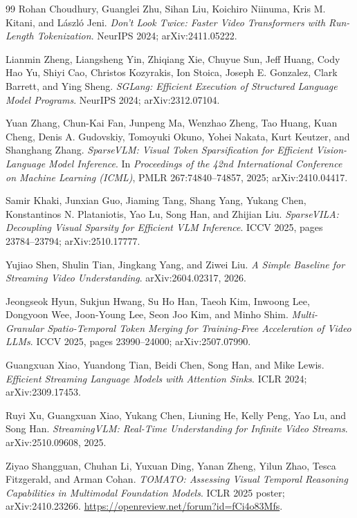\begin{thebibliography}{99}
Rohan Choudhury, Guanglei Zhu, Sihan Liu, Koichiro Niinuma, Kris M. Kitani,
and L\'aszl\'o Jeni.
\emph{Don't Look Twice: Faster Video Transformers with Run-Length
Tokenization}. NeurIPS 2024; arXiv:2411.05222.

Lianmin Zheng, Liangsheng Yin, Zhiqiang Xie, Chuyue Sun, Jeff Huang, Cody Hao
Yu, Shiyi Cao, Christos Kozyrakis, Ion Stoica, Joseph E. Gonzalez, Clark
Barrett, and Ying Sheng.
\emph{SGLang: Efficient Execution of Structured Language Model Programs}.
NeurIPS 2024; arXiv:2312.07104.

Yuan Zhang, Chun-Kai Fan, Junpeng Ma, Wenzhao Zheng, Tao Huang, Kuan Cheng,
Denis A. Gudovskiy, Tomoyuki Okuno, Yohei Nakata, Kurt Keutzer, and Shanghang
Zhang.
\emph{SparseVLM: Visual Token Sparsification for Efficient Vision-Language
Model Inference}. In \emph{Proceedings of the 42nd International Conference
on Machine Learning (ICML)}, PMLR 267:74840--74857, 2025;
arXiv:2410.04417.

Samir Khaki, Junxian Guo, Jiaming Tang, Shang Yang, Yukang Chen, Konstantinos
N. Plataniotis, Yao Lu, Song Han, and Zhijian Liu.
\emph{SparseVILA: Decoupling Visual Sparsity for Efficient VLM Inference}.
ICCV 2025, pages 23784--23794; arXiv:2510.17777.

Yujiao Shen, Shulin Tian, Jingkang Yang, and Ziwei Liu.
\emph{A Simple Baseline for Streaming Video Understanding}. arXiv:2604.02317,
2026.

Jeongseok Hyun, Sukjun Hwang, Su Ho Han, Taeoh Kim, Inwoong Lee, Dongyoon Wee,
Joon-Young Lee, Seon Joo Kim, and Minho Shim.
\emph{Multi-Granular Spatio-Temporal Token Merging for Training-Free
Acceleration of Video LLMs}. ICCV 2025, pages 23990--24000;
arXiv:2507.07990.

Guangxuan Xiao, Yuandong Tian, Beidi Chen, Song Han, and Mike Lewis.
\emph{Efficient Streaming Language Models with Attention Sinks}. ICLR 2024;
arXiv:2309.17453.

Ruyi Xu, Guangxuan Xiao, Yukang Chen, Liuning He, Kelly Peng, Yao Lu, and Song
Han.
\emph{StreamingVLM: Real-Time Understanding for Infinite Video Streams}.
arXiv:2510.09608, 2025.

Ziyao Shangguan, Chuhan Li, Yuxuan Ding, Yanan Zheng, Yilun Zhao, Tesca
Fitzgerald, and Arman Cohan.
\emph{TOMATO: Assessing Visual Temporal Reasoning Capabilities in Multimodal
Foundation Models}. ICLR 2025 poster; arXiv:2410.23266.
\url{https://openreview.net/forum?id=fCi4o83Mfs}.


\end{thebibliography}
